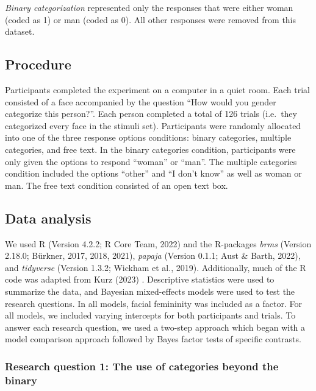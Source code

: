 \documentclass[
  man]{apa7}
\begin{document}
\emph{Binary categorization} represented only the responses that were either woman (coded as 1) or man (coded as 0). All other responses were removed from this dataset.

\hypertarget{procedure}{%
\subsection{Procedure}\label{procedure}}

Participants completed the experiment on a computer in a quiet room. Each trial consisted of a face accompanied by the question ``How would you gender categorize this person?''. Each person completed a total of 126 trials (i.e.~they categorized every face in the stimuli set). Participants were randomly allocated into one of the three response options conditions: binary categories, multiple categories, and free text. In the binary categories condition, participants were only given the options to respond ``woman'' or ``man''. The multiple categories condition included the options ``other'' and ``I don't know'' as well as woman or man. The free text condition consisted of an open text box.

\hypertarget{data-analysis}{%
\subsection{Data analysis}\label{data-analysis}}

We used R (Version 4.2.2; R Core Team, 2022) and the R-packages \emph{brms} (Version 2.18.0; Bürkner, 2017, 2018, 2021), \emph{papaja} (Version 0.1.1; Aust \& Barth, 2022), and \emph{tidyverse} (Version 1.3.2; Wickham et al., 2019). Additionally, much of the R code was adapted from Kurz (2023) . Descriptive statistics were used to summarize the data, and Bayesian mixed-effects models were used to test the research questions. In all models, facial femininity was included as a factor. For all models, we included varying intercepts for both participants and trials. To answer each research question, we used a two-step approach which began with a model comparison approach followed by Bayes factor tests of specific contrasts.

\hypertarget{research-question-1-the-use-of-categories-beyond-the-binary}{%
\subsubsection{Research question 1: The use of categories beyond the binary}\label{research-question-1-the-use-of-categories-beyond-the-binary}}
\end{document}
